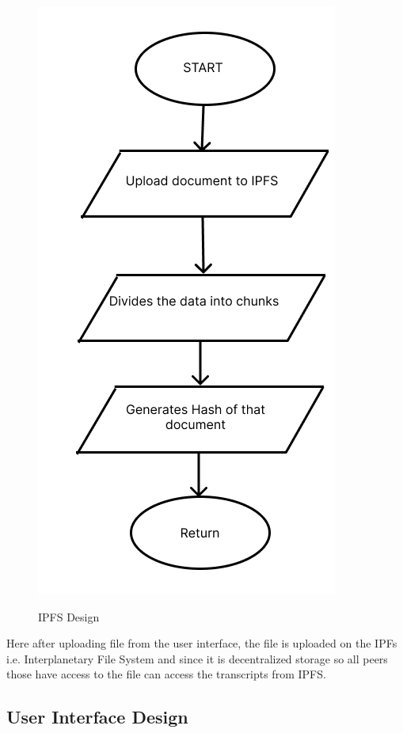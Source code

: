 \begin{figure}[H]
    \centering
    \includegraphics[scale=0.4]{images/IPFS_flowchart.png}\\[0.5cm]
    \caption{IPFS Design}
    \label{fig:my_label}
\end{figure}

\noindent
Here after uploading file from the user interface, the file is uploaded on the IPFs i.e. Interplanetary File System and since it is decentralized storage so all peers those have access to the file can access the transcripts from IPFS.

\subsection{User Interface Design} 

